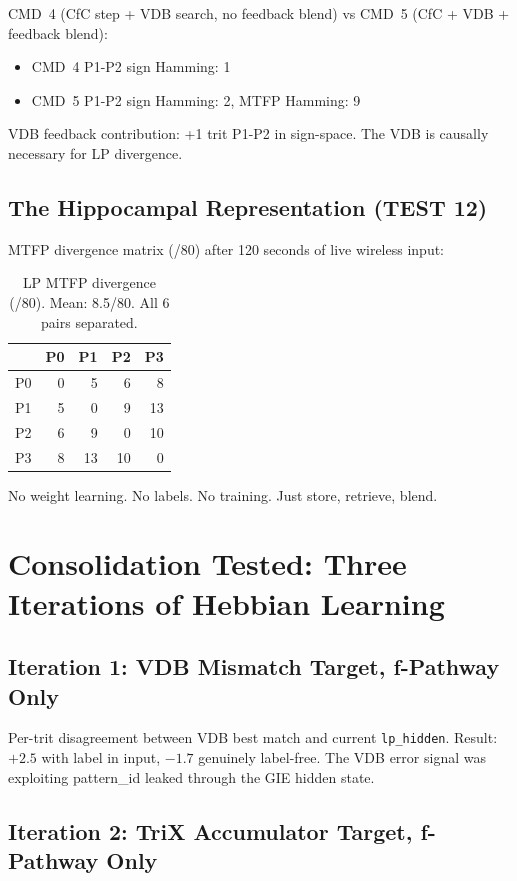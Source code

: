\documentclass[11pt,letterpaper]{article}
\begin{document}
CMD~4 (CfC step + VDB search, no feedback blend) vs CMD~5 (CfC + VDB + feedback blend):
\begin{itemize}
\item CMD~4 P1-P2 sign Hamming: 1
\item CMD~5 P1-P2 sign Hamming: 2, MTFP Hamming: 9
\end{itemize}

VDB feedback contribution: +1 trit P1-P2 in sign-space. The VDB is causally necessary for LP divergence.

\subsection{The Hippocampal Representation (TEST 12)}

MTFP divergence matrix (/80) after 120 seconds of live wireless input:

\begin{table}[h]
\centering
\begin{tabular}{l rrrr}
\toprule
& P0 & P1 & P2 & P3 \\
\midrule
P0 & 0 & 5 & 6 & 8 \\
P1 & 5 & 0 & 9 & 13 \\
P2 & 6 & 9 & 0 & 10 \\
P3 & 8 & 13 & 10 & 0 \\
\bottomrule
\end{tabular}
\caption{LP MTFP divergence (/80). Mean: 8.5/80. All 6 pairs separated.}
\end{table}

No weight learning. No labels. No training. Just store, retrieve, blend.

\section{Consolidation Tested: Three Iterations of Hebbian Learning}

\subsection{Iteration 1: VDB Mismatch Target, f-Pathway Only}

Per-trit disagreement between VDB best match and current \texttt{lp\_hidden}. Result: $+2.5$ with label in input, $-1.7$ genuinely label-free. The VDB error signal was exploiting pattern\_id leaked through the GIE hidden state.

\subsection{Iteration 2: TriX Accumulator Target, f-Pathway Only}
\end{document}
